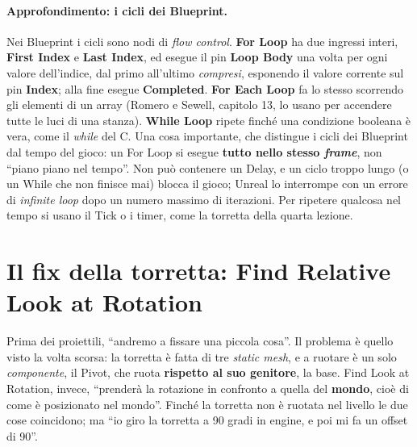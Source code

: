 \paragraph{Approfondimento: i cicli dei Blueprint.} Nei Blueprint i cicli sono nodi di
\emph{flow control}. \textbf{For Loop} ha due ingressi interi, \textbf{First Index} e
\textbf{Last Index}, ed esegue il pin \textbf{Loop Body} una volta per ogni valore
dell'indice, dal primo all'ultimo \emph{compresi}, esponendo il valore corrente sul pin
\textbf{Index}; alla fine esegue \textbf{Completed}. \textbf{For Each Loop} fa lo stesso
scorrendo gli elementi di un array (Romero e Sewell, capitolo 13, lo usano per accendere
tutte le luci di una stanza). \textbf{While Loop} ripete finché una condizione booleana
è vera, come il \emph{while} del C. Una cosa importante, che distingue i cicli dei
Blueprint dal tempo del gioco: un For Loop si esegue \textbf{tutto nello stesso
\emph{frame}}, non ``piano piano nel tempo''. Non può contenere un Delay, e un ciclo
troppo lungo (o un While che non finisce mai) blocca il gioco; Unreal lo interrompe con
un errore di \emph{infinite loop} dopo un numero massimo di iterazioni. Per ripetere
qualcosa nel tempo si usano il Tick o i timer, come la torretta della quarta lezione.

\section{Il fix della torretta: Find Relative Look at Rotation}
\label{ue5:sec:relative}

Prima dei proiettili, ``andremo a fissare una piccola cosa''. Il problema è quello visto
la volta scorsa: la torretta è fatta di tre \emph{static mesh}, e a ruotare è un solo
\emph{componente}, il Pivot, che ruota \textbf{rispetto al suo genitore}, la base. Find
Look at Rotation, invece, ``prenderà la rotazione in confronto a quella del
\textbf{mondo}, cioè di come è posizionato nel mondo''. Finché la torretta non è ruotata
nel livello le due cose coincidono; ma ``io giro la torretta a 90 gradi in engine, e poi
mi fa un offset di 90''.

